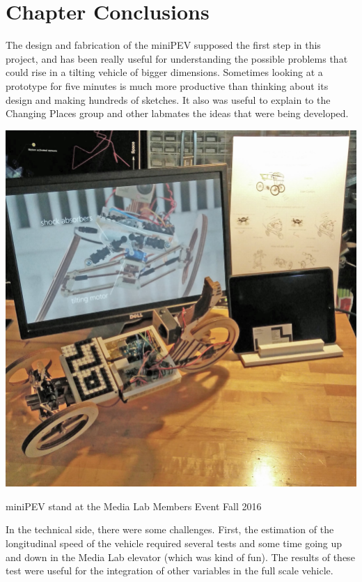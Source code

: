 \section{Chapter Conclusions}

The design and fabrication of the miniPEV supposed the first step in this project, and has been really useful for understanding the possible problems that could rise in a tilting vehicle of bigger dimensions. Sometimes looking at a prototype for five minutes is much more productive than thinking about its design and making hundreds of sketches. It also was useful to explain to the Changing Places group and other labmates the ideas that were being developed. 

\begin{marginfigure}
	\includegraphics[width=1.0\linewidth]{figs/04/sponsors_fall2}
	\caption{miniPEV stand at the Media Lab Members Event Fall 2016}
\end{marginfigure}

In the technical side, there were some challenges. First, the estimation of the longitudinal speed of the vehicle required several tests and some time going up and down in the Media Lab elevator (which was kind of fun). The results of these test were useful for the integration of other variables in the full scale vehicle.

